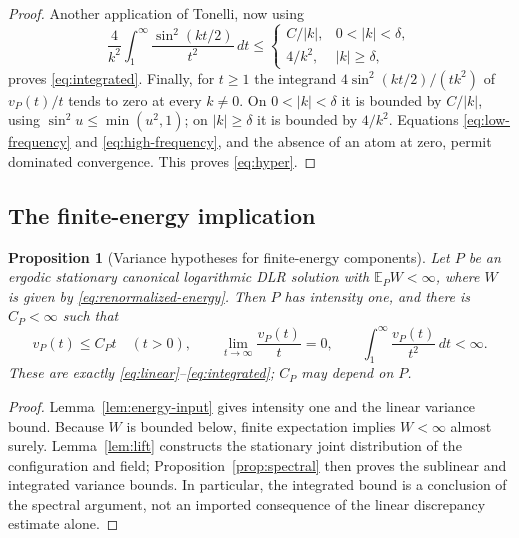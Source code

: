 \documentclass[11pt,reqno]{amsart}
\numberwithin{equation}{section}
\newtheorem{proposition}[theorem]{Proposition}
\theoremstyle{definition}
\theoremstyle{remark}
\newcommand{\E}{\mathbb E}
\newcommand{\1}{\mathbf 1}
\newcommand{\dd}{\,d}
\begin{document}
\begin{proof}
Another application of Tonelli, now using
\[
\frac4{k^2}\int_1^\infty\frac{\sin^2(kt/2)}{t^2}\dd t
\le
\begin{cases}
C/|k|,&0<|k|<\delta,\\
4/k^2,&|k|\ge\delta,
\end{cases}
\]
proves \eqref{eq:integrated}. Finally, for $t\ge1$ the integrand
$4\sin^2(kt/2)/(tk^2)$ of $v_P(t)/t$ tends to zero at every
$k\ne0$. On $0<|k|<\delta$ it is bounded by $C/|k|$, using
$\sin^2 u\le\min(u^2,1)$; on $|k|\ge\delta$ it is bounded by
$4/k^2$. Equations \eqref{eq:low-frequency} and
\eqref{eq:high-frequency}, and the absence of an atom at zero,
permit dominated convergence. This proves \eqref{eq:hyper}.
\end{proof}

\subsection{The finite-energy implication}

\begin{samepage}
\begin{proposition}[Variance hypotheses for finite-energy components]
\label{prop:energy-discrepancy}
Let $P$ be an ergodic stationary canonical logarithmic DLR solution
with $\E_PW<\infty$, where $W$ is given by
\eqref{eq:renormalized-energy}. Then $P$ has intensity one, and there is $C_P<\infty$ such that
\begin{equation}\label{eq:finite-energy-variance-conclusions}
v_P(t)\le C_Pt\quad(t>0),\qquad
\lim_{t\to\infty}\frac{v_P(t)}t=0,\qquad
\int_1^\infty\frac{v_P(t)}{t^2}\dd t<\infty.
\end{equation}
These are exactly \eqref{eq:linear}--\eqref{eq:integrated}; $C_P$ may
depend on $P$.
\end{proposition}
\end{samepage}

\begin{proof}
Lemma~\ref{lem:energy-input} gives intensity one and the linear
variance bound. Because $W$ is bounded below, finite expectation
implies $W<\infty$ almost surely. Lemma~\ref{lem:lift} constructs the
stationary joint distribution of the configuration and field; Proposition~\ref{prop:spectral} then proves
the sublinear and integrated variance bounds. In particular, the
integrated bound is a conclusion of the spectral argument, not an
imported consequence of the linear discrepancy estimate alone.
\end{proof}
\end{document}
